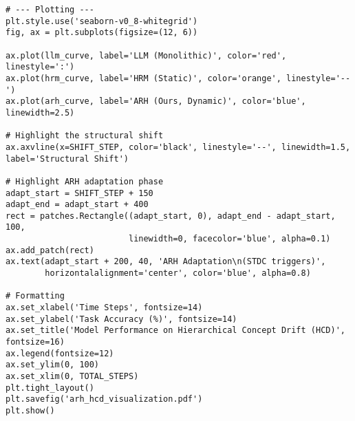 \documentclass{article}
\begin{document}
\begin{appendices}
\begin{verbatim}
# --- Plotting ---
plt.style.use('seaborn-v0_8-whitegrid')
fig, ax = plt.subplots(figsize=(12, 6))

ax.plot(llm_curve, label='LLM (Monolithic)', color='red', linestyle=':')
ax.plot(hrm_curve, label='HRM (Static)', color='orange', linestyle='--')
ax.plot(arh_curve, label='ARH (Ours, Dynamic)', color='blue', linewidth=2.5)

# Highlight the structural shift
ax.axvline(x=SHIFT_STEP, color='black', linestyle='--', linewidth=1.5, label='Structural Shift')

# Highlight ARH adaptation phase
adapt_start = SHIFT_STEP + 150
adapt_end = adapt_start + 400
rect = patches.Rectangle((adapt_start, 0), adapt_end - adapt_start, 100, 
                         linewidth=0, facecolor='blue', alpha=0.1)
ax.add_patch(rect)
ax.text(adapt_start + 200, 40, 'ARH Adaptation\n(STDC triggers)', 
        horizontalalignment='center', color='blue', alpha=0.8)

# Formatting
ax.set_xlabel('Time Steps', fontsize=14)
ax.set_ylabel('Task Accuracy (%)', fontsize=14)
ax.set_title('Model Performance on Hierarchical Concept Drift (HCD)', fontsize=16)
ax.legend(fontsize=12)
ax.set_ylim(0, 100)
ax.set_xlim(0, TOTAL_STEPS)
plt.tight_layout()
plt.savefig('arh_hcd_visualization.pdf')
plt.show()
\end{verbatim}
\end{appendices}
\end{document}
